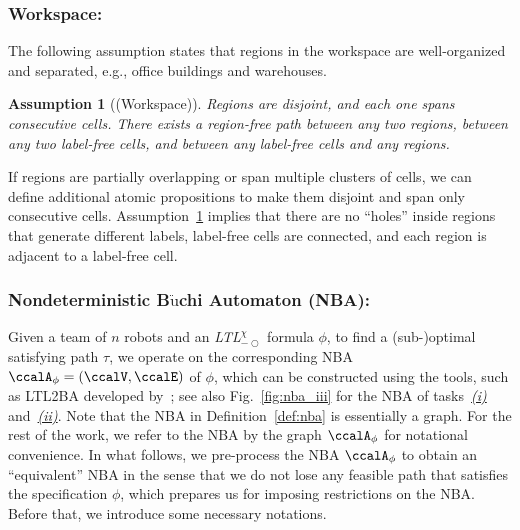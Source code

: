 \documentclass[Afour,sageh,times]{sagej}
\newtheorem{asmp}[thm]{Assumption}
\newcommand{\ltlx}{ {\it LTL}$_{-\bigcirc}^\chi$ }
\newcommand{\autop}{\ccalA_{\phi}}
\begin{document}
\subsubsection{Workspace:}
 The following assumption states that regions in the workspace are  well-organized and separated, e.g., office buildings and warehouses.
 \begin{asmp}[(Workspace)]\label{asmp:env}
 Regions are disjoint, and each one spans consecutive cells. There exists a region-free path between any two regions, between any two label-free cells, and between any label-free cells and any regions.
 \end{asmp}
 If regions are partially overlapping or span multiple clusters of cells, we can define additional atomic propositions to make them disjoint and span only consecutive cells.  Assumption~\ref{asmp:env} implies that there are no ``holes'' inside regions that generate different labels, label-free cells are connected, and each region is adjacent to a label-free cell.

\subsubsection{Nondeterministic B$\ddot{\text{u}}$chi Automaton (NBA):}\label{sec:nba}
Given a team of $n$ robots and an \ltlx formula $\phi$, to find a (sub-)optimal satisfying path $\tau$, we operate on the corresponding NBA $\autop = (\ccalV, \ccalE)$ of $\phi$, which can be constructed using the tools, such as LTL2BA developed by~\cite{gastin2001fast}; see also Fig.~\ref{fig:nba_iii} for the NBA of tasks~\hyperref[task:i]{\it (i)} and~\hyperref[task:ii]{\it (ii)}. Note that the NBA in Definition~\ref{def:nba} is essentially a graph. For the rest of the work, we refer to the NBA by the graph $\autop$ for notational convenience. In what follows, we pre-process the NBA $\autop$ to obtain an ``equivalent'' NBA in the sense that we do not lose any feasible path that satisfies the specification $\phi$, which prepares us for imposing restrictions on the NBA. Before that, we introduce some necessary notations.
\end{document}
